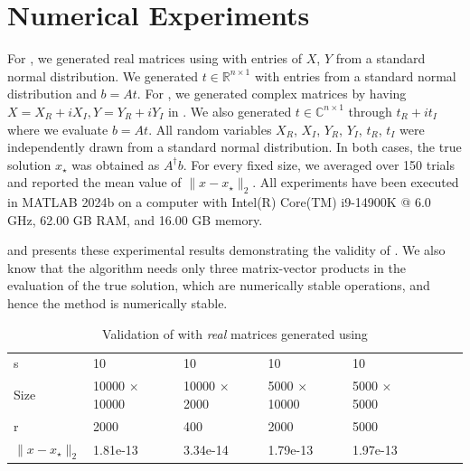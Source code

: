 \documentclass[a4paper,fleqn]{cas-sc}
\theoremstyle{definition}
\theoremstyle{remark}
\begin{document}
\section{Numerical Experiments }\label{sec:numerical_experiments}
 
For , we generated real matrices using  with entries of $X$, $Y$ from a standard normal distribution. We generated $t \in \mathbb{R}^{n \times 1}$ with entries from a standard normal distribution and $b=At$. For , we generated complex matrices by having $X=X_R + iX_I, Y=Y_R + iY_I$ in . We also generated $t \in \mathbb{C}^{n \times 1}$ through $t_R + it_I$ where we evaluate $b=At$. All random variables $X_R$, $X_I$, $Y_R$, $Y_I$, $t_R$, $t_I$ were independently drawn from a standard normal distribution. In both cases, the true solution $x_\star$ was obtained as $A^\dagger b$. For every fixed size, we averaged over 150 trials and reported the mean value of $\| x-x_\star \|_2$. All experiments have been executed in MATLAB 2024b on a computer with Intel(R) Core(TM) i9-14900K @ 6.0 GHz, 62.00 GB RAM, and 16.00 GB memory.

and  presents these experimental results demonstrating the validity of . We also know that the algorithm needs only three matrix-vector products in the evaluation of the true solution, which are numerically stable operations, and hence the method is numerically stable.

 \begin{table}%
\caption{Validation of  with \emph{real} matrices generated using  }\label{tab:matrix_with_equal_singular_values}
\begin{tabular*}{\tblwidth}{@{}LL@{}LL@{}LL@{}LL@{}}
\toprule
  s & 10 & 10 & 10 & 10 \\
        
  Size & 10000 $\times$ 10000 & 10000 $\times$ 2000  & 5000 $\times$ 10000 & 5000 $\times$ 5000\\
         
  r & 2000 & 400 & 2000 & 5000\\
\midrule
 $\|x-x_\star\|_2$  & 1.81e-13 & 3.34e-14  & 1.79e-13 & 1.97e-13\\
\bottomrule
\end{tabular*}
\end{table}
\end{document}
